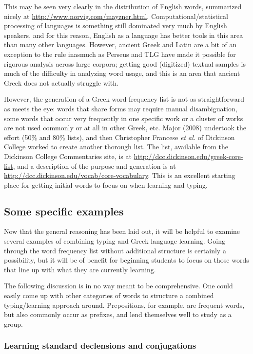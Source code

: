 \documentclass[11pt]{article}
\begin{document}
This may be seen very clearly in the distribution of English words, summarized nicely at \url{http://www.norvig.com/mayzner.html}. Computational/statistical processing of languages is something still dominated very much by English speakers, and for this reason, English as a language has better tools in this area than many other languages. However, ancient Greek and Latin are a bit of an exception to the rule inasmuch as Perseus and TLG have made it possible for rigorous analysis across large corpora; getting good (digitized) textual samples is much of the difficulty in analyzing word usage, and this is an area that ancient Greek does not actually struggle with.

However, the generation of a Greek word frequency list is not as straightforward as meets the eye: words that share forms may require manual disambiguation, some words that occur very frequently in one specific work or a cluster of works are not used commonly or at all in other Greek, etc. Major (2008) undertook the effort (50\% and 80\% lists), and then Christopher Francese \emph{et al.} of Dickinson College worked to create another thorough list. The list, available from the Dickinson College Commentaries site, is at \url{http://dcc.dickinson.edu/greek-core-list}, and a description of the purpose and generation is at \url{http://dcc.dickinson.edu/vocab/core-vocabulary}. This is an excellent starting place for getting initial words to focus on when learning and typing.

\subsection{Some specific examples}
\label{sec:orgca4e89d}

Now that the general reasoning has been laid out, it will be helpful to examine several examples of combining typing and Greek language learning. Going through the word frequency list without additional structure is certainly a possibility, but it will be of benefit for beginning students to focus on those words that line up with what they are currently learning. 

The following discussion is in no way meant to be comprehensive. One could easily come up with other categories of words to structure a combined typing/learning approach around. Prepositions, for example, are frequent words, but also commonly occur as prefixes, and lend themselves well to study as a group.

\subsubsection{Learning standard declensions and conjugations}
\label{sec:org36f0324}
\end{document}
